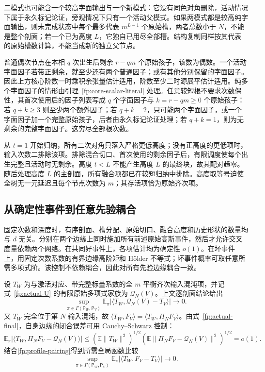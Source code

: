 \documentclass[a4paper]{tufte-handout}
\begin{document}
\begin{fullwidth}
二模式也可能含一个较高字面输出与一个新模式：它没有同色对角删除，活动情况下属于永久标记论证，旁观情况下只有一个活动父模式。如果两模式都是较高纯字面输出，则未完成状态中每个最多代表 $m^{L-1}$ 个原始槽，两者总数小于 $N$，不能是整个剖面；若一个已为高度 $L$，它独自已用尽全部槽。结构复制同样按其代表的原始槽数计算，不能当成新的独立父节点。

普通偶次节点在本相 $q$ 次出生后剩余 $r-qm$ 个原始孩子，该数为偶数。一个活动字面因子若带正剩余，就至少还有两个普通因子；或有其他分别保留的字面因子。因此上方核心阶数一时乘积余张量估计适用，阶数至少二时源展平估计适用。纯多个字面因子的情形由引理~\ref{fp:core-scalar-literal} 处理。任意较短根不要求次数偶性，其首次使用后的因子列表写成 $q$ 个字面因子与 $k=r-qm\ge0$ 个原始孩子：若 $q+k\ge3$ 则至少两个额外因子；若 $q+k=2$，只可能两个字面因子，或一个字面因子加一个完整原始孩子，后者由永久标记论证处理；若 $q+k=1$，则为无剩余的完整字面因子。这穷尽全部根次数。

从 $t=1$ 开始归纳，所有二次对角只落入严格更低高度；没有正高度的更低项时，输入次数二排除该项。排除混合切口、首次使用的剩余因子后，有限调度使每个出生完整且活动时无剩余。高度 $t<L$ 不能产生高度 $L$ 的最终块，故其配对趋零。随后处理高度 $L$ 的主剖面，所有融合项都已在较短归纳中排除。高度取等号迫使全树无一元延迟且每个节点次数为 $m$；其存活项恰为原始齐次项。

\subsection{从确定性事件到任意先验耦合}\label{fp:coupling-uniform}
固定次数和深度时，有序剖面、槽分配、原始切口、融合高度和历史形状的数量均与 $d$ 无关。分别在两个边缘上同时施加所有前述原始高斯事件，然后才允许交叉度量依赖两个网络。在共同好事件上，各项估计均为确定性 $o(1)$。在坏事件上，用固定次数系数的有界边缘高阶矩和 H\"older 不等式；坏事件概率可取任意所需多项式阶。该控制不依赖耦合，因此对所有先验边缘耦合一致。

设 $T_W$ 为与激活对应、带完整标量系数的全 $m$ 平衡齐次输入混沌项，并记式~\eqref{fp:actual-U} 的有限原始多项式家族为 $\mathcal Q_N(V)$。上文逐剖面结论给出
\begin{equation}\label{fp:profile-pairing}
 \sup_{\pi\in\Gamma(\mathsf P_W,\mathsf P_V)}
 \mathbb E_\pi\left|\langle T_W,\mathcal Q_N(V)-T_V\rangle\right|
 \longrightarrow0.
\end{equation}
又 $T_W$ 完全位于第 $N$ 输入混沌，故 $\langle T_W,F_V\rangle=\langle T_W,\Pi_NF_V\rangle$。由式~\eqref{fp:actual-final}，自身边缘的闭合误差可用 Cauchy--Schwarz 控制：
\[
 \mathbb E_\pi|\langle T_W,\Pi_NF_V-\mathcal Q_N(V)\rangle|
 \le(\mathbb E\|T_W\|^2)^{1/2}
      (\mathbb E\|\Pi_NF_V-\mathcal Q_N(V)\|^2)^{1/2}=o(1).
\]
结合\eqref{fp:profile-pairing}得到所需全局函数比较
\begin{equation}\label{fp:global-function-pairing}
 \boxed{\displaystyle
 \sup_{\pi\in\Gamma(\mathsf P_W,\mathsf P_V)}
 \mathbb E_\pi|\langle T_W,F_V-T_V\rangle|\longrightarrow0.}
\end{equation}


\end{fullwidth}
\end{document}
